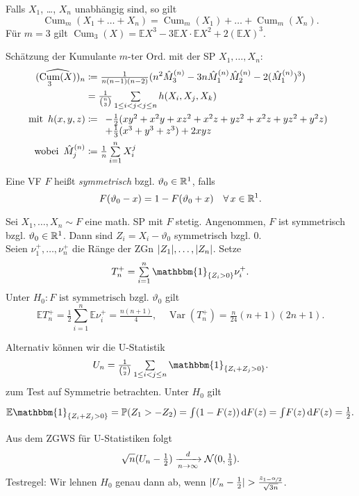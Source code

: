 \documentclass{cheat-sheet}
\renewcommand{\P}{\mathbb{P}} %
\newcommand{\E}{\mathbb{E}} %
\newcommand{\ind}{\mathbbm{1}} %
\DeclareMathOperator{\Cum}{Cum} %
\DeclareMathOperator{\var}{Var} %
\newcommand{\Normal}{\mathcal{N}} %
\begin{document}
\begin{bem}
  Falls $X_1$, \ldots, $X_n$ unabhängig sind, so gilt
  \[ \Cum_m(X_1 + \ldots + X_n) = \Cum_m(X_1) + \ldots + \Cum_m(X_n). \]
  Für $m=3$ gilt $\Cum_3(X) = \E X^3 - 3 \E X \cdot \E X^2 + 2 (\E X)^3$.
\end{bem}

\begin{bsp}
  Schätzung der Kumulante $m$-ter Ord. mit der SP $X_1, \ldots, X_n$:
  \begin{align*}
    (\widehat{\Cum_3(X)})_n & \coloneqq \tfrac{1}{n (n-1) (n-2)} (n^2 \hat{M}_3^{(n)} - 3 n \hat{M}_1^{(n)} \hat{M}_2^{(n)} - 2 (\hat{M}_1^{(n)})^3) \\
    & = \tfrac{1}{\binom{n}{3}} \sum_{1 \leq i < j < j \leq n} h(X_i, X_j, X_k) \\
    \text{mit} \enspace
    h(x, y, z) & \coloneqq \begin{array}[t]{l}
      - \tfrac{1}{2} (xy^2 + x^2 y + x z^2 + x^2 z + y z^2 + x^2 z + y z^2 + y^2 z) \\
      + \tfrac{1}{3} (x^3 + y^3 + z^3) + 2 xyz
    \end{array} \\
    \enspace \text{wobei} \enspace
    \hat{M}_j^{(n)} & \coloneqq \tfrac{1}{n} \sum_{i=1}^n X_i^j
  \end{align*}
\end{bsp}

\begin{defn}
  Eine VF $F$ heißt \emph{symmetrisch} bzgl. $\vartheta_0 \in \mathbb{R}^1$, falls
  \[
    F(\vartheta_0 - x) = 1 - F(\vartheta_0 + x) \quad
    \forall \, x \in \mathbb{R}^1.
  \]
\end{defn}

\begin{bsp}
  Sei $X_1, \ldots, X_n \sim F$ eine math. SP mit $F$ stetig.
  Angenommen, $F$ ist symmetrisch bzgl. $\vartheta_0 \in \mathbb{R}^1$.
  Dann sind $Z_i = X_i - \vartheta_0$ symmetrisch bzgl. $0$. \\
  Seien $\nu_1^{+}, \ldots, \nu_n^{+}$ die Ränge der ZGn $\lvert Z_1\rvert, \ldots, \lvert Z_n\rvert$.
  Setze
  \[ T_n^{+} = \sum_{i=1}^n \ind_{\{ Z_i > 0 \}} \nu_i^{+}. \]
  Unter $H_0 : \text{$F$ ist symmetrisch bzgl. $\vartheta_0$}$ gilt
  \[
    \E T_n^{+} = \tfrac{1}{2} \sum_{i=1}^n \E \nu_i^{+} = \tfrac{n (n+1)}{4}, \quad
    \var(T_n^{+}) = \tfrac{n}{24} (n + 1) (2n + 1).
  \]
\end{bsp}

\begin{bsp}
  Alternativ können wir die U-Statistik
  \[
    U_n = \tfrac{1}{\binom{n}{2}} \sum_{1 \leq i < j \leq n} \ind_{\{ Z_i + Z_j > 0 \}}.
  \]
  zum Test auf Symmetrie betrachten.
  Unter $H_0$ gilt
  \[
    \E \ind_{\{ Z_i + Z_j > 0 \}} = \P(Z_1 > - Z_2) = \Int{}{}{(1 - F(z))}{F(z)} = \Int{}{}{F(z)}{F(z)} = \tfrac{1}{2}.
  \]
  Aus dem ZGWS für U-Statistiken folgt
  \[
    \sqrt{n} (U_n - \tfrac{1}{2}) \xra[n \to \infty]{d} \Normal(0, \tfrac{1}{3}).
  \]
  Testregel: Wir lehnen $H_0$ genau dann ab, wenn \enspace
  $\lvert U_n - \tfrac{1}{2}\rvert > \tfrac{z_{1 - \nicefrac{\alpha}{2}}}{\sqrt{3n}}$.
\end{bsp}
\end{document}

